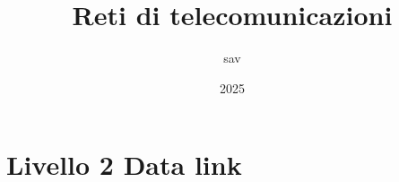 \documentclass{report}
\title{Reti di telecomunicazioni}
\author{sav}
\date{2025}
\begin{document}
\maketitle
\tableofcontents


%


%

%

%

\chapter{Livello 2 Data link}

%
%



\end{document}
